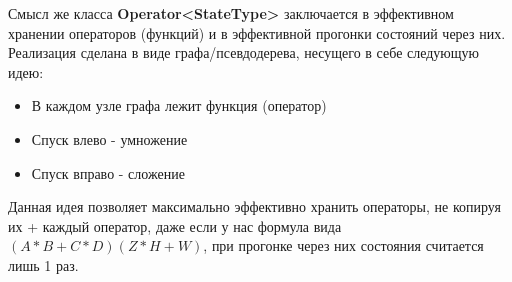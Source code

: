 \documentclass[12pt,fleqn]{article}
\begin{document}
        Смысл же класса \textbf{Operator<StateType>} заключается в эффективном хранении операторов (функций) и в эффективной прогонки состояний через них. Реализация сделана в виде графа/псевдодерева,
        несущего в себе следующую идею: 
            \begin{itemize}
            \item{В каждом узле графа лежит функция (оператор)}
            \item{Спуск влево - умножение}
            \item{Спуск вправо - сложение}
            \end{itemize}

        Данная идея позволяет максимально эффективно хранить операторы, не копируя их + каждый оператор, даже если у нас формула вида $(A*B + C*D)(Z*H + W)$, при прогонке
        через них состояния считается лишь 1 раз.
\end{document}
